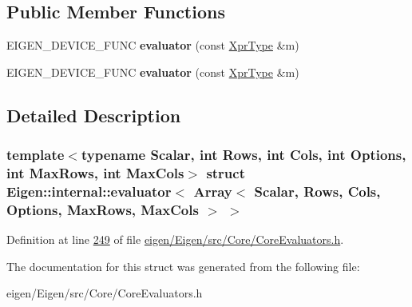 \subsection*{Public Member Functions}
\begin{DoxyCompactItemize}
\item 
\mbox{\label{struct_eigen_1_1internal_1_1evaluator_3_01_array_3_01_scalar_00_01_rows_00_01_cols_00_01_options211222ab89c0f0e9e4e97c28137aec40_a5bb6989dade9d2973cccd7b1c2041810}} 
E\+I\+G\+E\+N\+\_\+\+D\+E\+V\+I\+C\+E\+\_\+\+F\+U\+NC {\bfseries evaluator} (const \hyperlink{group___core___module_class_eigen_1_1_array}{Xpr\+Type} \&m)
\item 
\mbox{\label{struct_eigen_1_1internal_1_1evaluator_3_01_array_3_01_scalar_00_01_rows_00_01_cols_00_01_options211222ab89c0f0e9e4e97c28137aec40_a5bb6989dade9d2973cccd7b1c2041810}} 
E\+I\+G\+E\+N\+\_\+\+D\+E\+V\+I\+C\+E\+\_\+\+F\+U\+NC {\bfseries evaluator} (const \hyperlink{group___core___module_class_eigen_1_1_array}{Xpr\+Type} \&m)
\end{DoxyCompactItemize}


\subsection{Detailed Description}
\subsubsection*{template$<$typename Scalar, int Rows, int Cols, int Options, int Max\+Rows, int Max\+Cols$>$\newline
struct Eigen\+::internal\+::evaluator$<$ Array$<$ Scalar, Rows, Cols, Options, Max\+Rows, Max\+Cols $>$ $>$}



Definition at line \hyperlink{eigen_2_eigen_2src_2_core_2_core_evaluators_8h_source_l00249}{249} of file \hyperlink{eigen_2_eigen_2src_2_core_2_core_evaluators_8h_source}{eigen/\+Eigen/src/\+Core/\+Core\+Evaluators.\+h}.



The documentation for this struct was generated from the following file\+:\begin{DoxyCompactItemize}
\item 
eigen/\+Eigen/src/\+Core/\+Core\+Evaluators.\+h\end{DoxyCompactItemize}
